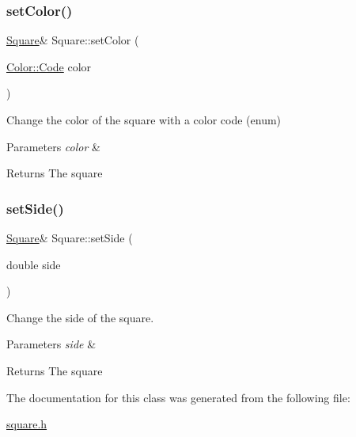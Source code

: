 \subsubsection{\texorpdfstring{set\+Color()}{setColor()}\hspace{0.1cm}{\footnotesize\ttfamily [2/2]}}
{\footnotesize\ttfamily \hyperlink{classSquare}{Square}\& Square\+::set\+Color (\begin{DoxyParamCaption}\item[{\hyperlink{classColor_a20a7b04657c1d83fae5d54514d3f1622}{Color\+::\+Code}}]{color }\end{DoxyParamCaption})}



Change the color of the square with a color code (enum) 


\begin{DoxyParams}{Parameters}
{\em color} & \\
\hline
\end{DoxyParams}
\begin{DoxyReturn}{Returns}
The square 
\end{DoxyReturn}
\mbox{\label{classSquare_aaa6dbd70e5595f58fc243dec633d09bf}} 
\subsubsection{\texorpdfstring{set\+Side()}{setSide()}}
{\footnotesize\ttfamily \hyperlink{classSquare}{Square}\& Square\+::set\+Side (\begin{DoxyParamCaption}\item[{double}]{side }\end{DoxyParamCaption})}



Change the side of the square. 


\begin{DoxyParams}{Parameters}
{\em side} & \\
\hline
\end{DoxyParams}
\begin{DoxyReturn}{Returns}
The square 
\end{DoxyReturn}


The documentation for this class was generated from the following file\+:\begin{DoxyCompactItemize}
\item 
\hyperlink{square_8h}{square.\+h}\end{DoxyCompactItemize}
